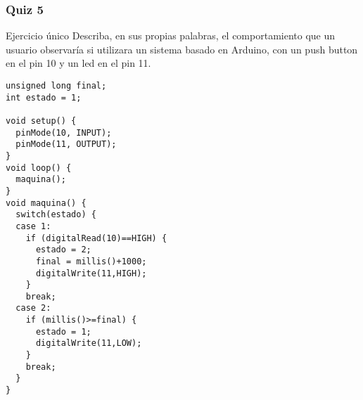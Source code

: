\documentclass{beamer}
\begin{document}
\begin{frame}[fragile=singleslide]\frametitle{Quiz 5}

\begin{block}{Ejercicio único}
Describa, en sus propias palabras, el comportamiento que un usuario observaría si utilizara un sistema basado en Arduino, con un push button en el pin 10 y un led en el pin 11.
\end{block}
\begin{block}{}
\begin{scriptsize}
\begin{verbatim}
unsigned long final;
int estado = 1;

void setup() {
  pinMode(10, INPUT);
  pinMode(11, OUTPUT);
}
void loop() {
  maquina();
}
void maquina() {
  switch(estado) {
  case 1:
  	if (digitalRead(10)==HIGH) {
  	  estado = 2;
  	  final = millis()+1000;
  	  digitalWrite(11,HIGH);
  	}
  	break;
  case 2:
    if (millis()>=final) {
      estado = 1;
      digitalWrite(11,LOW);
    }
    break;
  }  
}
\end{verbatim}
\end{scriptsize}
\end{block}

\end{frame}
\end{document}
